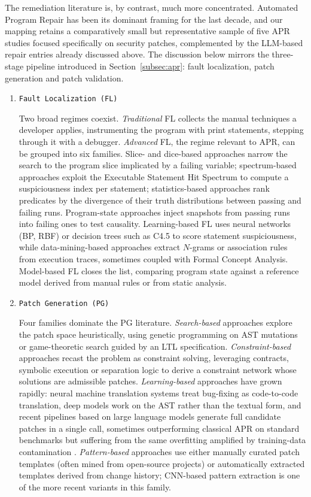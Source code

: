 The remediation literature is, by contrast, much more concentrated.
Automated Program Repair has been its dominant framing for the last
decade, and our mapping retains a comparatively small but
representative sample of five APR studies focused specifically on
security patches, complemented by the LLM-based repair entries already
discussed above. The discussion below mirrors the three-stage pipeline
introduced in Section~\ref{subsec:apr}: fault localization, patch
generation and patch validation.

\begin{enumerate}


 \item \texttt{Fault Localization (FL)}

Two broad regimes coexist. \emph{Traditional} FL collects the manual
techniques a developer applies, instrumenting the program with print
statements, stepping through it with a debugger. \emph{Advanced} FL,
the regime relevant to APR, can be grouped into six families. Slice-
and dice-based approaches narrow the search to the program slice
implicated by a failing variable; spectrum-based approaches exploit the
Executable Statement Hit Spectrum to compute a suspiciousness index per
statement; statistics-based approaches rank predicates by the
divergence of their truth distributions between passing and failing
runs. Program-state approaches inject snapshots from passing runs into
failing ones to test causality. Learning-based FL uses neural networks
(BP, RBF) or decision trees such as C4.5 to score statement
suspiciousness, while data-mining-based approaches extract $N$-grams or
association rules from execution traces, sometimes coupled with Formal
Concept Analysis. Model-based FL closes the list, comparing program
state against a reference model derived from manual rules or from
static analysis.

 \item \texttt{Patch Generation (PG)}

Four families dominate the PG literature. \emph{Search-based}
approaches explore the patch space heuristically, using genetic
programming on AST mutations or game-theoretic search guided by an
LTL specification. \emph{Constraint-based} approaches recast the
problem as constraint solving, leveraging contracts, symbolic
execution or separation logic to derive a constraint network whose
solutions are admissible patches. \emph{Learning-based} approaches
have grown rapidly: neural machine translation systems treat
bug-fixing as code-to-code translation, deep models work on the AST
rather than the textual form, and recent pipelines based on large
language models generate full candidate patches in a single call,
sometimes outperforming classical APR on standard benchmarks but
suffering from the same overfitting amplified by training-data
contamination \citep{placeholder-llm-repair}.
\emph{Pattern-based} approaches use either manually curated patch
templates (often mined from open-source projects) or automatically
extracted templates derived from change history; CNN-based pattern
extraction is one of the more recent variants in this family.


\end{enumerate}

